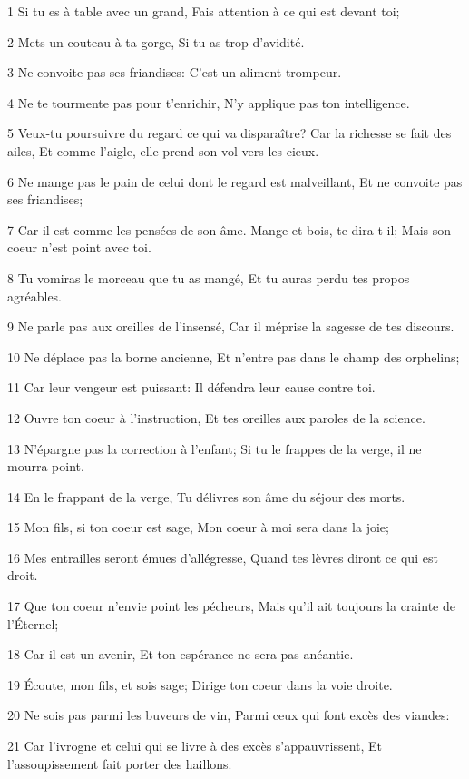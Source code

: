 \par 1 Si tu es à table avec un grand, Fais attention à ce qui est devant toi;
\par 2 Mets un couteau à ta gorge, Si tu as trop d'avidité.
\par 3 Ne convoite pas ses friandises: C'est un aliment trompeur.
\par 4 Ne te tourmente pas pour t'enrichir, N'y applique pas ton intelligence.
\par 5 Veux-tu poursuivre du regard ce qui va disparaître? Car la richesse se fait des ailes, Et comme l'aigle, elle prend son vol vers les cieux.
\par 6 Ne mange pas le pain de celui dont le regard est malveillant, Et ne convoite pas ses friandises;
\par 7 Car il est comme les pensées de son âme. Mange et bois, te dira-t-il; Mais son coeur n'est point avec toi.
\par 8 Tu vomiras le morceau que tu as mangé, Et tu auras perdu tes propos agréables.
\par 9 Ne parle pas aux oreilles de l'insensé, Car il méprise la sagesse de tes discours.
\par 10 Ne déplace pas la borne ancienne, Et n'entre pas dans le champ des orphelins;
\par 11 Car leur vengeur est puissant: Il défendra leur cause contre toi.
\par 12 Ouvre ton coeur à l'instruction, Et tes oreilles aux paroles de la science.
\par 13 N'épargne pas la correction à l'enfant; Si tu le frappes de la verge, il ne mourra point.
\par 14 En le frappant de la verge, Tu délivres son âme du séjour des morts.
\par 15 Mon fils, si ton coeur est sage, Mon coeur à moi sera dans la joie;
\par 16 Mes entrailles seront émues d'allégresse, Quand tes lèvres diront ce qui est droit.
\par 17 Que ton coeur n'envie point les pécheurs, Mais qu'il ait toujours la crainte de l'Éternel;
\par 18 Car il est un avenir, Et ton espérance ne sera pas anéantie.
\par 19 Écoute, mon fils, et sois sage; Dirige ton coeur dans la voie droite.
\par 20 Ne sois pas parmi les buveurs de vin, Parmi ceux qui font excès des viandes:
\par 21 Car l'ivrogne et celui qui se livre à des excès s'appauvrissent, Et l'assoupissement fait porter des haillons.
